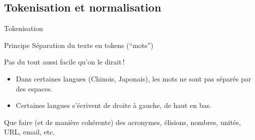 \subsection{Tokenisation et normalisation}

\begin{frame}{Tokenisation}

\begin{defblock}{Principe}
Séparation du texte en \alert{tokens} (``mots'')
\end{defblock}

\smallskip


Pas du tout aussi facile qu'on le dirait\,!

\begin{itemize}

\item Dans certaines langues (Chinois, Japonais), les mots  \alert{ne sont pas}
séparés par des espaces.

\item Certaines langues s'écrivent de droite à gauche, de haut en bas.

\end{itemize}


\begin{blocgauche}
Que faire (et de manière \alert{cohérente}) des acronymes, élisions, nombres, unités, URL, email, etc.
\end{blocgauche}

\end{frame}

